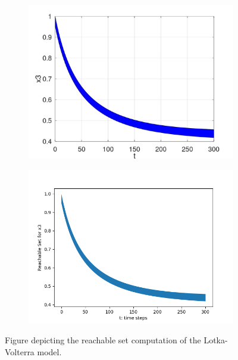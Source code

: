 \documentclass[EPiC]{easychair}
\begin{document}
\begin{figure}[h]
    \begin{subfigure}{0.47\textwidth}
    \centering
    \includegraphics[width=\textwidth]{SapoFigures/LV/SapoLV_X3.jpg}
    \end{subfigure}
    \begin{subfigure}{0.47\textwidth}
    \centering
    \includegraphics[width=1.1\textwidth,height=0.82\textwidth]{SapoFigures/LV/KaaLV_X3.png}
    \end{subfigure}
    
    \caption{Figure depicting the reachable set computation of the Lotka-Volterra model.} 
    \label{fig4}
\end{figure}
\end{document}
